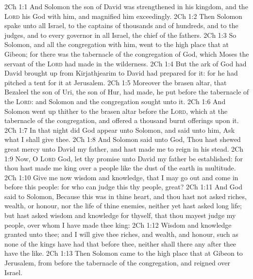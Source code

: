 \vs 2Ch 1:1 And Solomon the son of David was strengthened in his kingdom, and the \textsc{Lord} his God  with him, and magnified him exceedingly.
\vs 2Ch 1:2 Then Solomon spake unto all Israel, to the captains of thousands and of hundreds, and to the judges, and to every governor in all Israel, the chief of the fathers.
\vs 2Ch 1:3 So Solomon, and all the congregation with him, went to the high place that  at Gibeon; for there was the tabernacle of the congregation of God, which Moses the servant of the \textsc{Lord} had made in the wilderness.
\vs 2Ch 1:4 But the ark of God had David brought up from Kirjathjearim to  David had prepared for it: for he had pitched a tent for it at Jerusalem.
\vs 2Ch 1:5 Moreover the brasen altar, that Bezaleel the son of Uri, the son of Hur, had made, he put before the tabernacle of the \textsc{Lord}: and Solomon and the congregation sought unto it.
\vs 2Ch 1:6 And Solomon went up thither to the brasen altar before the \textsc{Lord}, which  at the tabernacle of the congregation, and offered a thousand burnt offerings upon it.
\vs 2Ch 1:7 In that night did God appear unto Solomon, and said unto him, Ask what I shall give thee.
\vs 2Ch 1:8 And Solomon said unto God, Thou hast shewed great mercy unto David my father, and hast made me to reign in his stead.
\vs 2Ch 1:9 Now, O \textsc{Lord} God, let thy promise unto David my father be established: for thou hast made me king over a people like the dust of the earth in multitude.
\vs 2Ch 1:10 Give me now wisdom and knowledge, that I may go out and come in before this people: for who can judge this thy people,  great?
\vs 2Ch 1:11 And God said to Solomon, Because this was in thine heart, and thou hast not asked riches, wealth, or honour, nor the life of thine enemies, neither yet hast asked long life; but hast asked wisdom and knowledge for thyself, that thou mayest judge my people, over whom I have made thee king:
\vs 2Ch 1:12 Wisdom and knowledge  granted unto thee; and I will give thee riches, and wealth, and honour, such as none of the kings have had that  before thee, neither shall there any after thee have the like.
\vs 2Ch 1:13 Then Solomon came  to the high place that  at Gibeon to Jerusalem, from before the tabernacle of the congregation, and reigned over Israel.
